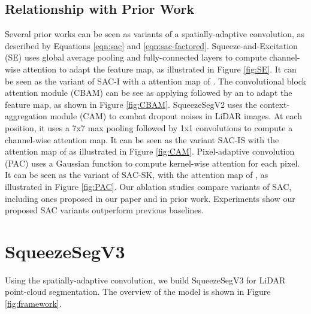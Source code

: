 \documentclass[runningheads]{llncs}
\begin{document}
\subsection{Relationship with Prior Work}
Several prior works can be seen as variants of a spatially-adaptive convolution, as described by Equations \ref{eqn:sac} and \ref{eqn:sac-factored}.
Squeeze-and-Excitation (SE) \cite{hu2018squeeze,hu2018gather} uses global average pooling and fully-connected layers to compute channel-wise attention to adapt the feature map, as illustrated in Figure \ref{fig:SE}. It can be seen as the variant of SAC-I with a attention map of . The convolutional block attention module (CBAM) \cite{woo2018cbam} can be see as applying  followed by an  to adapt the feature map, as shown in Figure \ref{fig:CBAM}. SqueezeSegV2 \cite{wu2018squeezesegv2} uses the context-aggregation module (CAM) to combat dropout noises in LiDAR images. At each position, it uses a 7x7 max pooling followed by 1x1 convolutions to compute a channel-wise attention map. It can be seen as the variant SAC-IS with the attention map of  as illustrated in Figure \ref{fig:CAM}. Pixel-adaptive convolution (PAC) \cite{su2019pixel} uses a Gaussian function to compute kernel-wise attention for each pixel. It can be seen as the variant of SAC-SK, with the attention map of , as illustrated in Figure \ref{fig:PAC}. Our ablation studies compare variants of SAC, including ones proposed in our paper and in prior work. Experiments show our proposed SAC variants outperform previous baselines. 

























\section{SqueezeSegV3}

Using the spatially-adaptive convolution, we build SqueezeSegV3 for LiDAR point-cloud segmentation. The overview of the model is shown in Figure \ref{fig:framework}. 
\end{document}
